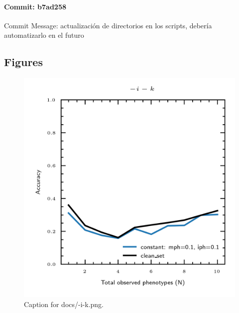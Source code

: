 \documentclass{article}
\begin{document}
\paragraph{Commit: b7ad258}
Commit Message: actualización de directorios en los scripts, debería automatizarlo en el futuro

\subsection{Figures}
\begin{figure}[h] \centering \includegraphics{docs/-i-k.png} \caption{Caption for docs/-i-k.png.} \end{figure}
\end{document}
